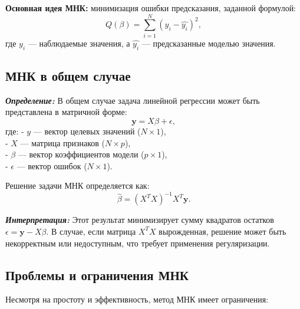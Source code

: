 \textbf{Основная идея МНК:} минимизация ошибки предсказания, заданной формулой:
\[
Q(\beta) = \sum_{i=1}^{N} (y_i - \hat{y_i})^2,
\]
где \(y_i\) — наблюдаемые значения, а \( \hat{y_i} \) — предсказанные моделью значения.

\subsection{МНК в общем случае}

\textbf{\textit{Определение:}}
В общем случае задача линейной регрессии может быть представлена в матричной форме:
\[
\mathbf{y} = X \beta + \epsilon,
\]
где:
- \(y\) — вектор целевых значений (\(N \times 1\)), \\
- \(X\) — матрица признаков (\(N \times p\)), \\
- \(\beta\) — вектор коэффициентов модели (\(p \times 1\)), \\
- \(\epsilon\) — вектор ошибок (\(N \times 1\)).

Решение задачи МНК определяется как:
\[
\hat{\beta} = (X^T X)^{-1} X^T \mathbf{y}.
\]

\textbf{\textit{Интерпретация:}}
Этот результат минимизирует сумму квадратов остатков \(\epsilon = \mathbf{y} - X\beta\). В случае, если матрица \(X^T X\) вырожденная, решение может быть некорректным или недоступным, что требует применения регуляризации.

\subsection{Проблемы и ограничения МНК}

Несмотря на простоту и эффективность, метод МНК имеет ограничения:

